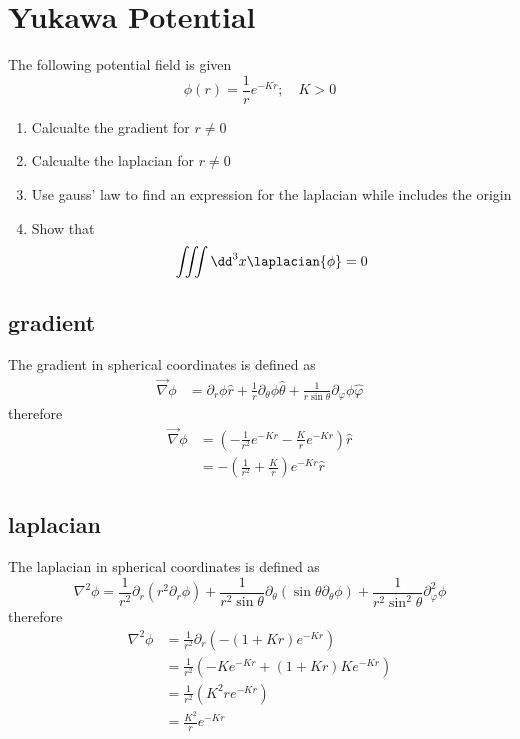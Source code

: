 \clearpage
\section{Yukawa Potential}
\begin{colbox}
	The following potential field is given
  \begin{equation}
    \phi(r) = \frac{1}{r}e^{-Kr}; \quad K>0
  \end{equation}
  \begin{enumerate}
    \item Calcualte the gradient for \(r\neq0\)
    \item Calcualte the laplacian for \(r\neq0\)
    \item Use gauss' law to find an expression for the laplacian while includes the origin
    \item Show that \begin{equation}
      \iiint\dd^3x\laplacian{\phi}=0
    \end{equation}
  \end{enumerate}
\end{colbox}
\subsection{gradient}
The gradient in spherical coordinates is defined as
\begin{align*}
    \Vec{\nabla}\phi &= \partial_r\phi\hat{r}+\frac{1}{r}\partial_\theta\phi\hat{\theta}+\frac{1}{r\sin\theta}\partial_\varphi\phi\hat{\varphi}
\end{align*}
therefore
\begin{align*}
    \Vec{\nabla}\phi &= \left(-\frac{1}{r^2}e^{-Kr}-\frac{K}{r}e^{-Kr}\right)\hat{r}\\
    &= -\left(\frac{1}{r^2}+\frac{K}{r}\right)e^{-Kr}\hat{r}
\end{align*}
\subsection{laplacian}
The laplacian in spherical coordinates is defined as
\begin{equation*}
    \nabla^2\phi = \frac{1}{r^2}\partial_r(r^2\partial_r\phi)+\frac{1}{r^2\sin\theta}\partial_\theta(\sin\theta\partial_\theta\phi)+\frac{1}{r^2\sin^2\theta}\partial^2_\varphi\phi
\end{equation*}
therefore
\begin{align*}
    \nabla^2\phi &= \frac{1}{r^2}\partial_r(-\left(1+Kr\right)e^{-Kr})\\
    &= \frac{1}{r^2}(-Ke^{-Kr}+\left(1+Kr\right)Ke^{-Kr})\\
    &= \frac{1}{r^2}(K^2re^{-Kr})\\
    &= \frac{K^2}{r}e^{-Kr}
\end{align*}

